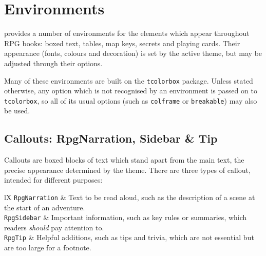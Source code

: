\def\fmt{\color{gray!60}\small}
\def\lorumIpsumOne{{\fmt{}Lorem ipsum dolor sit amet, consectetuer adipiscing elit. Ut purus elit,
			vestibulum ut, placerat ac, adipiscing vitae, felis. Curabitur dictum gravida mauris. }}
\def\lorumIpsumTwo{{\fmt{}Nam arcu libero, nonummy eget,
			consectetuer id, vulputate a, magna. Donec vehicula augue eu neque.
			Pellentesque habitant morbi tristique senectus et netus et malesuada
			fames ac turpis egestas. }}
\def\lorumIpsumThree{{\fmt{}Mauris ut leo. Cras viverra metus rhoncus
			sem. Nulla et lectus vestibulum urna fringilla ultrices. Phasellus eu
			tellus sit amet tortor gravida placerat. Integer sapien est, iaculis in,
			pretium quis, viverra ac, nunc. }}
\chapter{Environments}

	\rpgtex{} provides a number of environments for the elements which appear throughout RPG books: boxed text, tables, map keys, secrets and playing cards. Their appearance (fonts, colours and decoration) is set by the active theme, but may be adjusted through their options.

	Many of these environments are built on the \texttt{tcolorbox} package. Unless stated otherwise, any option which is not recognised by an environment is passed on to \texttt{tcolorbox}, so all of its usual options (such as \texttt{colframe} or \texttt{breakable}) may also be used.

	\section{Callouts: RpgNarration, Sidebar \& Tip}\label{S:Callouts}

		Callouts are boxed blocks of text which stand apart from the main text, the precise appearance determined by the theme. There are three types of callout, intended for different purposes:
		\begin{RpgTable}{lX}
			\texttt{RpgNarration} & Text to be read aloud, such as the description of a scene at the start of an adventure.
			\\
			\texttt{RpgSidebar} & Important information, such as key rules or summaries, which readers \textit{should} pay attention to.
			\\
			\texttt{RpgTip} & Helpful additions, such as tips and trivia, which are not essential but are too large for a footnote.
		\end{RpgTable}

